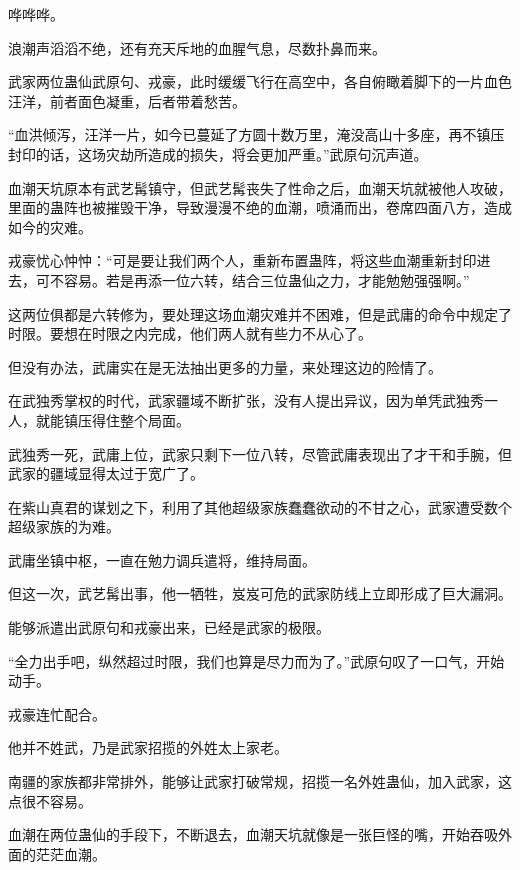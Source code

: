 
\begin{this_body}



哗哗哗。

浪潮声滔滔不绝，还有充天斥地的血腥气息，尽数扑鼻而来。

武家两位蛊仙武原句、戎豪，此时缓缓飞行在高空中，各自俯瞰着脚下的一片血色汪洋，前者面色凝重，后者带着愁苦。

“血洪倾泻，汪洋一片，如今已蔓延了方圆十数万里，淹没高山十多座，再不镇压封印的话，这场灾劫所造成的损失，将会更加严重。”武原句沉声道。

血潮天坑原本有武艺髯镇守，但武艺髯丧失了性命之后，血潮天坑就被他人攻破，里面的蛊阵也被摧毁干净，导致漫漫不绝的血潮，喷涌而出，卷席四面八方，造成如今的灾难。

戎豪忧心忡忡：“可是要让我们两个人，重新布置蛊阵，将这些血潮重新封印进去，可不容易。若是再添一位六转，结合三位蛊仙之力，才能勉勉强强啊。”

这两位俱都是六转修为，要处理这场血潮灾难并不困难，但是武庸的命令中规定了时限。要想在时限之内完成，他们两人就有些力不从心了。

但没有办法，武庸实在是无法抽出更多的力量，来处理这边的险情了。

在武独秀掌权的时代，武家疆域不断扩张，没有人提出异议，因为单凭武独秀一人，就能镇压得住整个局面。

武独秀一死，武庸上位，武家只剩下一位八转，尽管武庸表现出了才干和手腕，但武家的疆域显得太过于宽广了。

在紫山真君的谋划之下，利用了其他超级家族蠢蠢欲动的不甘之心，武家遭受数个超级家族的为难。

武庸坐镇中枢，一直在勉力调兵遣将，维持局面。

但这一次，武艺髯出事，他一牺牲，岌岌可危的武家防线上立即形成了巨大漏洞。

能够派遣出武原句和戎豪出来，已经是武家的极限。

“全力出手吧，纵然超过时限，我们也算是尽力而为了。”武原句叹了一口气，开始动手。

戎豪连忙配合。

他并不姓武，乃是武家招揽的外姓太上家老。

南疆的家族都非常排外，能够让武家打破常规，招揽一名外姓蛊仙，加入武家，这点很不容易。

血潮在两位蛊仙的手段下，不断退去，血潮天坑就像是一张巨怪的嘴，开始吞吸外面的茫茫血潮。


\end{this_body}
